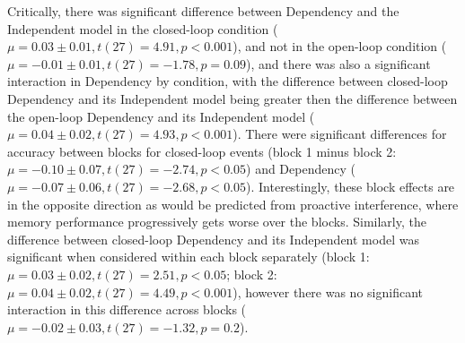 \documentclass[11pt, titlepage, twoside]{article}
\begin{document}
Critically, there was significant difference between Dependency and the Independent model in the closed-loop condition ($\mu=0.03\pm0.01, t(27)=4.91, p<0.001$), and not in the open-loop condition ($\mu=-0.01\pm0.01, t(27)=-1.78, p=0.09$), and there was also a significant interaction in Dependency by condition, with the difference between closed-loop Dependency and its Independent model being greater then the difference between the open-loop Dependency and its Independent model ($\mu=0.04\pm0.02, t(27)=4.93, p<0.001$).  There were significant differences for accuracy between blocks for closed-loop events (block 1 minus block 2: $\mu=-0.10\pm0.07, t(27)=-2.74, p<0.05$) and Dependency ($\mu=-0.07\pm0.06, t(27)=-2.68, p<0.05$).  Interestingly, these block effects are in the opposite direction as would be predicted from proactive interference, where memory performance progressively gets worse over the blocks.  Similarly, the difference between closed-loop Dependency and its Independent model was significant when considered within each block separately (block 1: $\mu=0.03\pm0.02, t(27)=2.51, p<0.05$; block 2: $\mu=0.04\pm0.02, t(27)=4.49, p<0.001$), however there was no significant interaction in this difference across blocks ($\mu=-0.02\pm0.03, t(27)=-1.32, p=0.2$).
\end{document}
